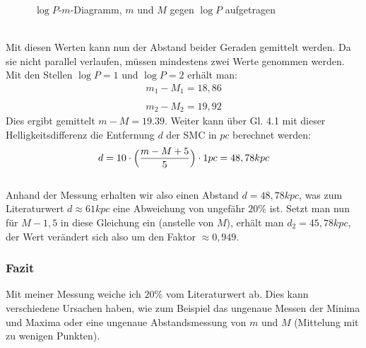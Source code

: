 \documentclass[12pt]{article}
\begin{document}
\begin{figure}[h!]
    \centering
{}
\caption[short]{$\log P$-$m$-Diagramm, $m$ und $M$ gegen $\log P$ aufgetragen}
\end{figure}\\
Mit diesen Werten kann nun der Abstand beider Geraden gemittelt werden. Da sie nicht parallel verlaufen, müssen mindestens zwei Werte genommen werden. Mit den Stellen $\log P = 1$ und $\log P = 2$ erhält man:\\
\[\begin{aligned}
    m_1-M_1 =  18,86\\\\
    m_2 - M_2 = 19,92
    \end{aligned}\]
Dies ergibt gemittelt $m-M = 19.39$. Weiter kann über Gl. 4.1 mit dieser Helligkeitsdifferenz die Entfernung $d$ der SMC in $pc$ berechnet werden:
\[d=10\cdot \Bigl(\frac{m-M+5}{5}\Bigr) \cdot 1pc = 48,78 kpc\]\\
Anhand der Messung erhalten wir also einen Abstand $d = 48,78 kpc$, was zum Literaturwert $d \approx 61 kpc$ eine Abweichung von ungefähr $20 \%$ ist. Setzt man nun für $M-1,5$ in diese Gleichung ein (anstelle von $M$), erhält man $d_2 = 45,78kpc$, der Wert verändert sich also um den Faktor $\approx 0,949$.
\subsubsection*{Fazit}
Mit meiner Messung weiche ich $20 \%$ vom Literaturwert ab. Dies kann verschiedene Ursachen haben, wie zum Beispiel das ungenaue Messen der Minima und Maxima oder eine ungenaue Abstandsmessung von $m$ und $M$ (Mittelung mit zu wenigen Punkten).
\newpage\noindent
\end{document}
